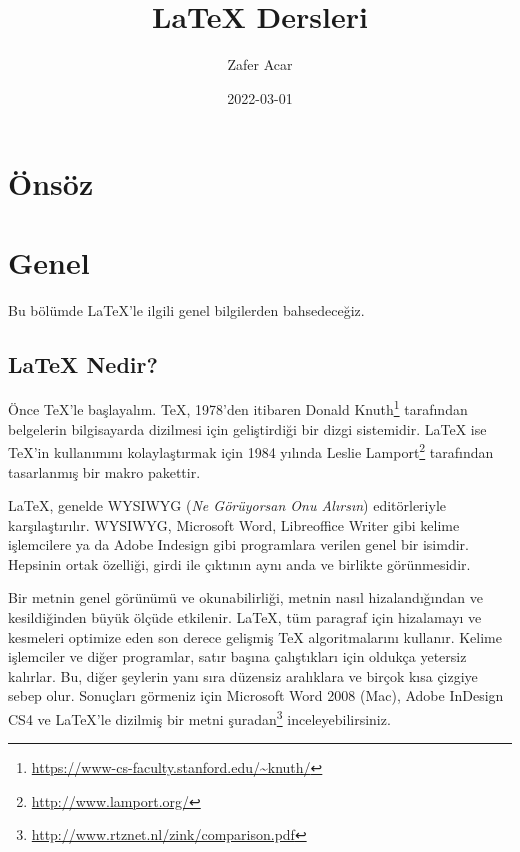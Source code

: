 \documentclass[
  10pt,
]{scrbook}
\title{LaTeX Dersleri}
\author{Zafer Acar}
\date{2022-03-01}
\renewcommand{\href}[2]{#2\footnote{\url{#1}}}
\theoremstyle{definition}
\theoremstyle{definition}
\theoremstyle{definition}
\theoremstyle{definition}
\theoremstyle{remark}
\begin{document}
\maketitle

\newcommand{\insvg}{\begingroup%
\renewcommand{\includegraphics}{}%
\noindent\rule{\textwidth}{1pt}%
}%
\newcommand{\outsvg}{%
\\\noindent\rule{\textwidth}{1pt}%
\endgroup%
}%

{
\setcounter{tocdepth}{2}
\tableofcontents
}
\listoffigures
\listoftables
\hypertarget{uxf6nsuxf6z}{%
\chapter*{Önsöz}\label{uxf6nsuxf6z}}

\mainmatter

\hypertarget{genel}{%
\chapter{Genel}\label{genel}}

Bu bölümde LaTeX'le ilgili genel bilgilerden bahsedeceğiz.

\hypertarget{latex-nedir}{%
\section{LaTeX Nedir?}\label{latex-nedir}}

Önce TeX'le başlayalım. TeX, 1978'den itibaren \href{https://www-cs-faculty.stanford.edu/~knuth/}{Donald Knuth} tarafından belgelerin bilgisayarda dizilmesi için geliştirdiği bir dizgi sistemidir. LaTeX ise TeX'in kullanımını kolaylaştırmak için 1984 yılında \href{http://www.lamport.org/}{Leslie Lamport} tarafından tasarlanmış bir makro pakettir.

LaTeX, genelde WYSIWYG (\emph{Ne Görüyorsan Onu Alırsın}) editörleriyle karşılaştırılır. WYSIWYG, Microsoft Word, Libreoffice Writer gibi kelime işlemcilere ya da Adobe Indesign gibi programlara verilen genel bir isimdir. Hepsinin ortak özelliği, girdi ile çıktının aynı anda ve birlikte görünmesidir.

Bir metnin genel görünümü ve okunabilirliği, metnin nasıl hizalandığından ve kesildiğinden büyük ölçüde etkilenir. LaTeX, tüm paragraf için hizalamayı ve kesmeleri optimize eden son derece gelişmiş TeX algoritmalarını kullanır. Kelime işlemciler ve diğer programlar, satır başına çalıştıkları için oldukça yetersiz kalırlar. Bu, diğer şeylerin yanı sıra düzensiz aralıklara ve birçok kısa çizgiye sebep olur. Sonuçları görmeniz için Microsoft Word 2008 (Mac), Adobe InDesign CS4 ve LaTeX'le dizilmiş bir metni \href{http://www.rtznet.nl/zink/comparison.pdf}{şuradan} inceleyebilirsiniz.
\end{document}
